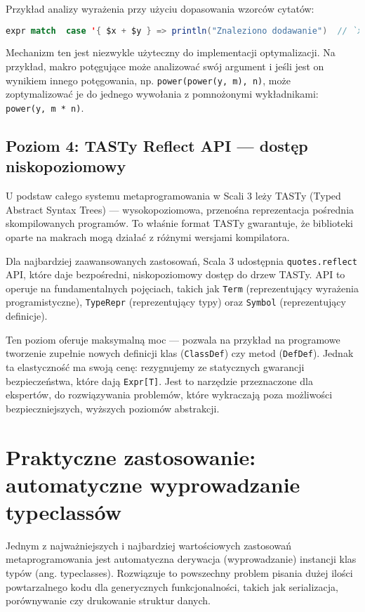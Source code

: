 Przykład analizy wyrażenia przy użyciu dopasowania wzorców cytatów:
\begin{lstlisting}[language=Scala,caption={Analiza wyrażenia z użyciem wzorców cytatów},label={lst:quote-pattern}]
expr match  case '{ $x + $y } => println("Znaleziono dodawanie")  // `x` i `y` są teraz zmiennymi typu `Expr`  case _ => println("Inne wyrażenie")
\end{lstlisting}

Mechanizm ten jest niezwykle użyteczny do implementacji optymalizacji.
Na przykład, makro potęgujące może analizować swój argument i jeśli jest on wynikiem innego potęgowania, np. \verb|power(power(y, m), n)|, może zoptymalizować je do jednego wywołania z pomnożonymi wykładnikami: \verb|power(y, m * n)|.

\subsection{Poziom 4: TASTy Reflect API — dostęp niskopoziomowy}
U podstaw całego systemu metaprogramowania w Scali 3 leży TASTy (Typed Abstract Syntax Trees) — wysokopoziomowa, przenośna reprezentacja pośrednia skompilowanych programów.
To właśnie format TASTy gwarantuje, że biblioteki oparte na makrach mogą działać z różnymi wersjami kompilatora.

Dla najbardziej zaawansowanych zastosowań, Scala 3 udostępnia \verb|quotes.reflect| API, które daje bezpośredni, niskopoziomowy dostęp do drzew TASTy.
API to operuje na fundamentalnych pojęciach, takich jak \verb|Term| (reprezentujący wyrażenia programistyczne), \verb|TypeRepr| (reprezentujący typy) oraz \verb|Symbol| (reprezentujący definicje).

Ten poziom oferuje maksymalną moc — pozwala na przykład na programowe tworzenie zupełnie nowych definicji klas (\verb|ClassDef|) czy metod (\verb|DefDef|).
Jednak ta elastyczność ma swoją cenę: rezygnujemy ze statycznych gwarancji bezpieczeństwa, które dają \verb|Expr[T]|.
Jest to narzędzie przeznaczone dla ekspertów, do rozwiązywania problemów, które wykraczają poza możliwości bezpieczniejszych, wyższych poziomów abstrakcji.


\section{Praktyczne zastosowanie: automatyczne wyprowadzanie typeclassów}
Jednym z najważniejszych i najbardziej wartościowych zastosowań metaprogramowania jest automatyczna derywacja (wyprowadzanie) instancji klas typów (ang. typeclasses).
Rozwiązuje to powszechny problem pisania dużej ilości powtarzalnego kodu dla generycznych funkcjonalności, takich jak serializacja, porównywanie czy drukowanie struktur danych.

